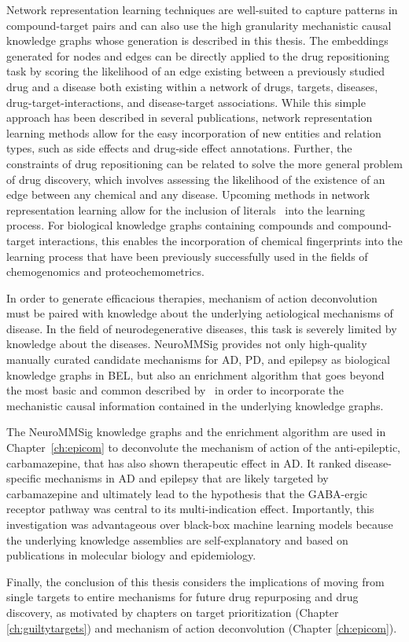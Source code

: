 Network representation learning techniques are well-suited to capture patterns in compound-target pairs and can also use the high granularity mechanistic causal knowledge graphs whose generation is described in this thesis.
The embeddings generated for nodes and edges can be directly applied to the drug repositioning task by scoring the likelihood of an edge existing between a previously studied drug and a disease both existing within a network of drugs, targets, diseases, drug-target-interactions, and disease-target associations.
While this simple approach has been described in several publications, network representation learning methods allow for the easy incorporation of new entities and relation types, such as side effects and drug-side effect annotations.
Further, the constraints of drug repositioning can be related to solve the more general problem of drug discovery, which involves assessing the likelihood of the existence of an edge between any chemical and any disease.
Upcoming methods in network representation learning allow for the inclusion of literals~\cite{Kristiadi2018} into the learning process.
For biological knowledge graphs containing compounds and compound-target interactions, this enables the incorporation of chemical fingerprints into the learning process that have been previously successfully used in the fields of chemogenomics and proteochemometrics.

In order to generate efficacious therapies, mechanism of action deconvolution must be paired with knowledge about the underlying aetiological mechanisms of disease.
In the field of neurodegenerative diseases, this task is severely limited by knowledge about the diseases.
NeuroMMSig provides not only high-quality manually curated candidate mechanisms for \ac{AD}, \ac{PD}, and epilepsy as biological knowledge graphs in \ac{BEL}, but also an enrichment algorithm that goes beyond the most basic and common described by~\cite{Khatri2012} in order to incorporate the mechanistic causal information contained in the underlying knowledge graphs.

The NeuroMMSig knowledge graphs and the enrichment algorithm are used in Chapter~\ref{ch:epicom} to deconvolute the mechanism of action of the anti-epileptic, carbamazepine, that has also shown therapeutic effect in \ac{AD}.
It ranked disease-specific mechanisms in \ac{AD} and epilepsy that are likely targeted by carbamazepine and ultimately lead to the hypothesis that the GABA-ergic receptor pathway was central to its multi-indication effect.
Importantly, this investigation was advantageous over black-box machine learning models because the underlying knowledge assemblies are self-explanatory and based on publications in molecular biology and epidemiology.

Finally, the conclusion of this thesis considers the implications of moving from single targets to entire mechanisms for future drug repurposing and drug discovery, as motivated by chapters on target prioritization (Chapter \ref{ch:guiltytargets}) and mechanism of action deconvolution (Chapter \ref{ch:epicom}).
